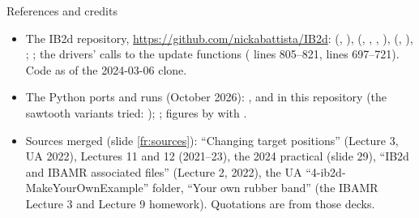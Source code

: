 \documentclass[aspectratio=169,11pt]{beamer}
\begin{document}
\begin{frame}{References and credits}
\label{fr:refs}
\scriptsize
\begin{itemize}
  \item The IB2d repository, \url{https://github.com/nickabattista/IB2d}:  (, ),  (, , , ),  (, ), ; ; the drivers' calls to the update functions ( lines 805--821,  lines 697--721). Code as of the 2024-03-06 clone.
  \item The Python ports and runs (October 2026): ,  and  in this repository (the sawtooth variants tried: ); ; figures by  with .
  \item Sources merged (slide \ref{fr:sources}): ``Changing target positions'' (Lecture 3, UA 2022), Lectures 11 and 12 (2021--23), the 2024 practical (slide 29), ``IB2d and IBAMR associated files'' (Lecture 2, 2022), the UA ``4-ib2d-MakeYourOwnExample'' folder, ``Your own rubber band'' (the IBAMR Lecture 3 and Lecture 9 homework). Quotations are from those decks.
\end{itemize}
\end{frame}
\end{document}
